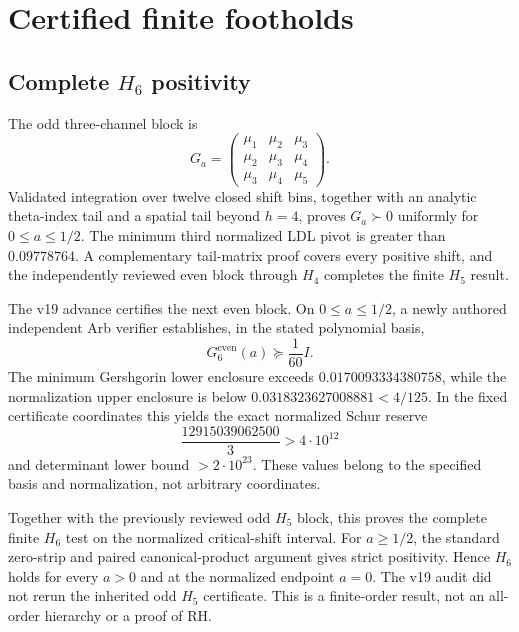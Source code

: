 \documentclass[11pt]{article}
\theoremstyle{definition}
\theoremstyle{remark}
\newcommand{\pd}{\succ 0}
\begin{document}
\section{Certified finite footholds}

\subsection{Complete \texorpdfstring{$H_6$}{H6} positivity}

The odd three-channel block is
\begin{equation}
 G_a=\begin{pmatrix}
 \mu_1&\mu_2&\mu_3\\
 \mu_2&\mu_3&\mu_4\\
 \mu_3&\mu_4&\mu_5
 \end{pmatrix}.
\end{equation}
Validated integration over twelve closed shift bins, together with an analytic
theta-index tail and a spatial tail beyond $h=4$, proves $G_a\pd$ uniformly for
$0\le a\le1/2$. The minimum third normalized LDL pivot is greater than
$0.09778764$. A complementary tail-matrix proof covers every positive shift,
and the independently reviewed even block through $H_4$ completes the finite
$H_5$ result.

The v19 advance certifies the next even block. On $0\le a\le1/2$, a newly
authored independent Arb verifier establishes, in the stated polynomial basis,
\begin{equation}
 G^{\mathrm{even}}_6(a)\succeq\frac1{60}I.
 \label{eq:h6-reserve}
\end{equation}
The minimum Gershgorin lower enclosure exceeds
$0.0170093334380758$, while the normalization upper enclosure is below
$0.0318323627008881<4/125$. In the fixed certificate coordinates this yields
the exact normalized Schur reserve
\begin{equation}
 \frac{12915039062500}{3}>4\cdot10^{12}
\end{equation}
and determinant lower bound $>2\cdot10^{23}$. These values belong to the
specified basis and normalization, not arbitrary coordinates.

Together with the previously reviewed odd $H_5$ block, this proves the complete
finite $H_6$ test on the normalized critical-shift interval. For $a\ge1/2$,
the standard zero-strip and paired canonical-product argument gives strict
positivity. Hence $H_6$ holds for every $a>0$ and at the normalized endpoint
$a=0$. The v19 audit did not rerun the inherited odd $H_5$ certificate. This is
a finite-order result, not an all-order hierarchy or a proof of RH.
\end{document}
